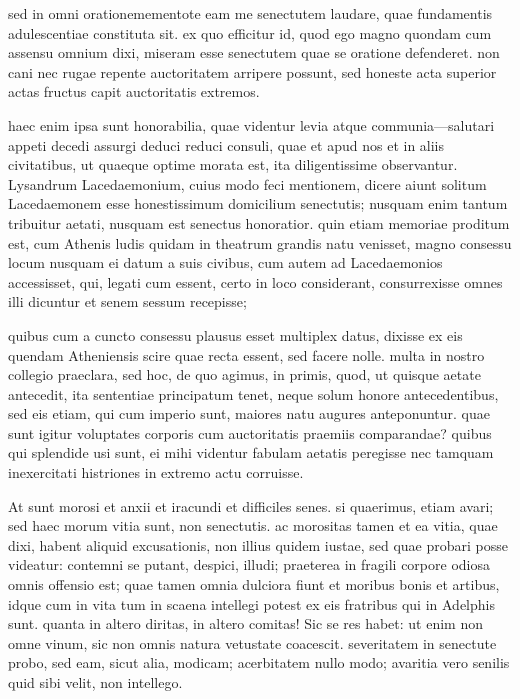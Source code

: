  sed in omni orationemementote eam me senectutem laudare, quae fundamentis adulescentiae constituta sit. ex quo efficitur id, quod ego magno quondam cum assensu omnium dixi, miseram esse senectutem quae se oratione defenderet. non cani nec rugae repente auctoritatem arripere possunt, sed honeste acta superior actas fructus capit auctoritatis extremos.

 haec enim ipsa sunt honorabilia, quae videntur levia atque communia—salutari appeti decedi assurgi deduci reduci consuli, quae et apud nos et in aliis civitatibus, ut quaeque optime morata est, ita diligentissime observantur. Lysandrum Lacedaemonium, cuius modo feci mentionem, dicere aiunt solitum Lacedaemonem esse honestissimum domicilium senectutis; nusquam enim tantum tribuitur aetati, nusquam est senectus honoratior. quin etiam memoriae proditum est, cum Athenis ludis quidam in theatrum grandis natu venisset, magno consessu locum nusquam ei datum a suis civibus, cum autem ad Lacedaemonios accessisset, qui, legati cum essent, certo in loco considerant, consurrexisse omnes illi dicuntur et senem sessum recepisse;

 quibus cum a cuncto consessu plausus esset multiplex datus, dixisse ex eis quendam Atheniensis scire quae recta essent, sed facere nolle. multa in nostro collegio praeclara, sed hoc, de quo agimus, in primis, quod, ut quisque aetate antecedit, ita sententiae principatum tenet, neque solum honore antecedentibus, sed eis etiam, qui cum imperio sunt, maiores natu augures anteponuntur. quae sunt igitur voluptates corporis cum auctoritatis praemiis comparandae? quibus qui splendide usi sunt, ei mihi videntur fabulam aetatis peregisse nec tamquam inexercitati histriones in extremo actu corruisse.

 At sunt morosi et anxii et iracundi et difficiles senes. si quaerimus, etiam avari; sed haec morum vitia sunt, non senectutis. ac morositas tamen et ea vitia, quae dixi, habent aliquid excusationis, non illius quidem iustae, sed quae probari posse videatur: contemni se putant, despici, illudi; praeterea in fragili corpore odiosa omnis offensio est; quae tamen omnia dulciora fiunt et moribus bonis et artibus, idque cum in vita tum in scaena intellegi potest ex eis fratribus qui in Adelphis sunt. quanta in altero diritas, in altero comitas! Sic se res habet: ut enim non omne vinum, sic non omnis natura vetustate coacescit. severitatem in senectute probo, sed eam, sicut alia, modicam; acerbitatem nullo modo; avaritia vero senilis quid sibi velit, non intellego.

